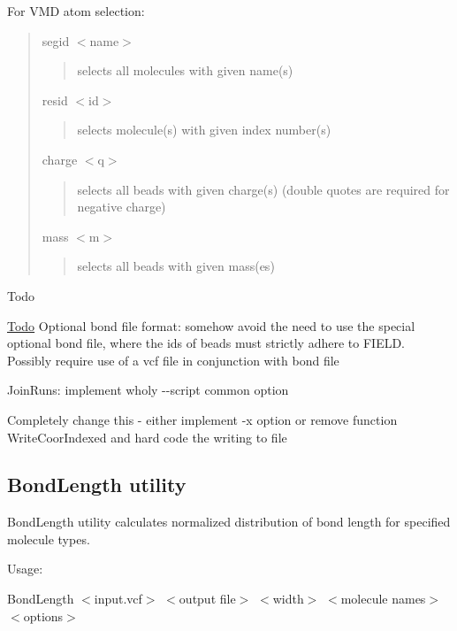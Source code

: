 For V\+MD atom selection\+: \begin{quote}
{\ttfamily segid $<$name$>$} \begin{quote}
selects all molecules with given name(s) \end{quote}
{\ttfamily resid $<$id$>$} \begin{quote}
selects molecule(s) with given index number(s) \end{quote}
{\ttfamily charge $<$q$>$} \begin{quote}
selects all beads with given charge(s) (double quotes are required for negative charge) \end{quote}
{\ttfamily mass $<$m$>$} \begin{quote}
selects all beads with given mass(es) \end{quote}
\end{quote}


\begin{DoxyRefDesc}{Todo}
\item[\hyperlink{todo__todo000001}{Todo}]Optional bond file format\+: somehow avoid the need to use the special optional bond file, where the ids of beads must strictly adhere to F\+I\+E\+LD. Possibly require use of a vcf file in conjunction with bond file 

Join\+Runs\+: implement wholy {\ttfamily -\/-\/script} common option 

Completely change this -\/ either implement {\ttfamily -\/x} option or remove function {\ttfamily Write\+Coor\+Indexed} and hard code the writing to file\end{DoxyRefDesc}
\hypertarget{Common_BondLength}{}\subsection{Bond\+Length utility}\label{Common_BondLength}
Bond\+Length utility calculates normalized distribution of bond length for specified molecule types.

Usage\+:

{\ttfamily Bond\+Length $<$input.\+vcf$>$ $<$output file$>$ $<$width$>$ $<$molecule names$>$ $<$options$>$}


